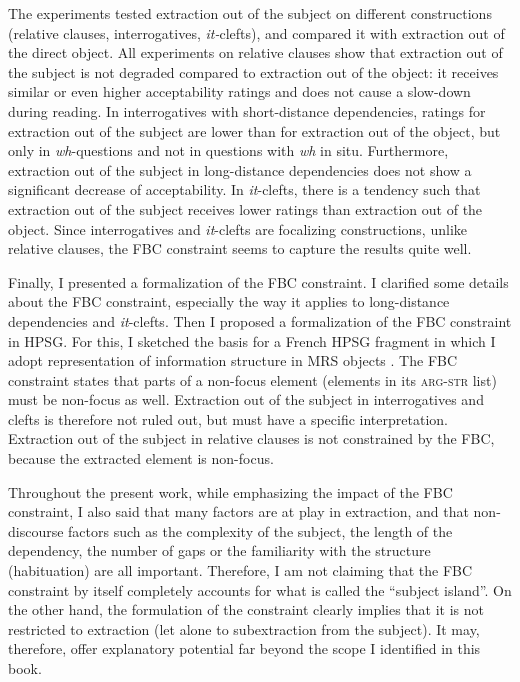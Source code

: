 The experiments tested extraction out of the subject on different constructions (relative clauses, interrogatives, \emph{it-}clefts), and compared it with extraction out of the direct object. All experiments on relative clauses show that extraction out of the subject is not degraded compared to extraction out of the object: it receives similar or even higher acceptability ratings and does not cause a slow-down during reading. In interrogatives with short-distance dependencies, ratings for extraction out of the subject are lower than for extraction out of the object, but only in \emph{wh}-questions and not in questions with \emph{wh} in situ. Furthermore, extraction out of the subject in long-distance dependencies does not show a significant decrease of acceptability. In \emph{it}-clefts, there is a tendency such that extraction out of the subject receives lower ratings than extraction out of the object. Since interrogatives and \emph{it}-clefts are focalizing constructions, unlike relative clauses, the FBC constraint seems to capture the results quite well.

Finally, I presented a formalization of the FBC constraint. I clarified some details about the FBC constraint, especially the way it applies to long-distance dependencies and \emph{it}-clefts. Then I proposed a formalization of the FBC constraint in HPSG. For this, I sketched the basis for a French HPSG fragment in which I adopt  representation of information structure in MRS objects \citep{Copestake.2005}. The FBC constraint states that parts of a non-focus element (elements in its \textsc{arg-str} list) must be non-focus as well. Extraction out of the subject in interrogatives and clefts is therefore not ruled out, but must have a specific interpretation. Extraction out of the subject in relative clauses is not constrained by the FBC, because the extracted element is non-focus.

Throughout the present work, while emphasizing the impact of the FBC constraint, I also said that many factors are at play in extraction, and that non-discourse factors such as the complexity of the subject, the length of the dependency, the number of gaps or the familiarity with the structure (habituation) are all important. Therefore, I am not claiming that the FBC constraint by itself completely accounts for what is called the ``subject island''. On the other hand, the formulation of the constraint clearly implies that it is not restricted to extraction (let alone to subextraction from the subject). It may, therefore, offer explanatory potential far beyond the scope I identified in this book.

